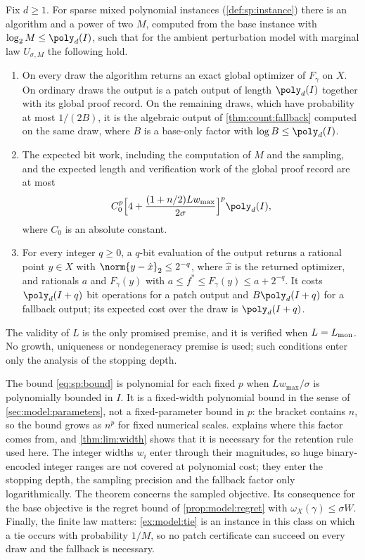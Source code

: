 \begin{theorem}\label{thm:sp:main}
Fix $d\ge1$. For sparse mixed polynomial instances
(\cref{def:sp:instance}) there is an algorithm and a power of two $M$,
computed from the base instance with $\log_2M\le\poly_d(I)$, such that for
the ambient perturbation model with marginal law $U_{\sigma,M}$ the
following hold.
\begin{enumerate}[label=(\roman*)]
\item\label{it:sp:exact} On every draw the algorithm returns an exact global
optimizer of $F_\gamma$ on $X$. On ordinary draws the output is a patch
output of length $\poly_d(I)$ together with its global proof record. On the
remaining draws, which have probability at most $1/(2B)$, it is the
algebraic output of \cref{thm:count:fallback} computed on the same draw,
where $B$ is a base-only factor with $\log B\le\poly_d(I)$.
\item\label{it:sp:work} The expected bit work, including the computation of
$M$ and the sampling, and the expected length and verification work of the
global proof record are at most
\begin{equation}\label{eq:sp:bound}
 C_0^p\Bigl[4+\frac{(1+n/2)Lw_{\max}}{2\sigma}\Bigr]^p\poly_d(I),
\end{equation}
where $C_0$ is an absolute constant.
\item\label{it:sp:eval} For every integer $q\ge0$, a $q$-bit evaluation of
the output returns a rational point $y\in X$ with
$\norm{y-\hat x}_2\le2^{-q}$, where $\hat x$ is the returned optimizer, and
rationals $a$ and $F_\gamma(y)$ with $a\le f^*\le F_\gamma(y)\le a+2^{-q}$.
It costs $\poly_d(I+q)$ bit operations for a patch output and
$B\poly_d(I+q)$ for a fallback output; its expected cost over the draw is
$\poly_d(I+q)$.
\end{enumerate}
The validity of $L$ is the only promised premise, and it is verified when
$L=L_{\rm mon}$. No growth, uniqueness or nondegeneracy premise is used; such
conditions enter only the analysis of the stopping depth.
\end{theorem}

The bound \eqref{eq:sp:bound} is polynomial for each fixed $p$ when
$Lw_{\max}/\sigma$ is polynomially bounded in $I$. It is a fixed-width
polynomial bound in the sense of \cref{sec:model:parameters}, not a
fixed-parameter bound in $p$: the bracket contains $n$, so the bound grows as
$n^p$ for fixed numerical scales.  explains where this
factor comes from, and \cref{thm:lim:width} shows that it is necessary for
the retention rule used here. The integer widths $w_i$ enter through their
magnitudes, so huge binary-encoded integer ranges are not covered at
polynomial cost; they enter the stopping depth, the sampling precision and
the fallback factor only logarithmically. The theorem concerns the sampled
objective. Its consequence for the base objective is the regret bound of
\cref{prop:model:regret} with $\omega_X(\gamma)\le\sigma W$. Finally, the
finite law matters: \cref{ex:model:tie} is an instance in this class on
which a tie occurs with probability $1/M$, so no patch certificate can
succeed on every draw and the fallback is necessary.

